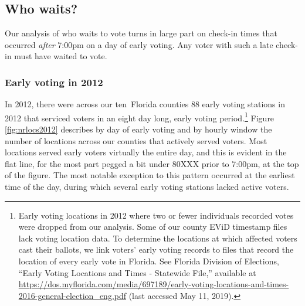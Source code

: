 \documentclass[12pt,titlepage]{article}
\newcommand{\numcounties}{ten}
\begin{document}

\subsection*{Who waits?}

Our analysis of who waits to vote turns in large part on check-in
times that occurred \emph{after} 7:00pm on a day of early voting.  Any
voter with such a late check-in must have waited to vote.

\subsubsection*{Early voting in 2012}




In 2012, there were across our \numcounties\ Florida counties 88 early
voting stations in 2012 that serviced voters in an eight day long,
early voting period.\footnote{Early voting locations in 2012 where two
  or fewer individuals recorded votes were dropped from our analysis.
  Some of our county EViD timestamp files lack voting location data.
  To determine the locations at which affected voters cast their
  ballots, we link voters' early voting records to files that record
  the location of every early vote in Florida. See Florida Division of
  Elections, ``Early Voting Locations and Times - Statewide File,''
  available at
  \url{https://dos.myflorida.com/media/697189/early-voting-locations-and-times-2016-general-election_eng.pdf}
  (last accessed May 11, 2019).}  Figure \ref{fig:nrlocs2012}
describes by day of early voting and by hourly window the number of
locations across our counties that actively served voters. Most
locations served early voters virtually the entire day, and this is
evident in the flat line, for the most part pegged a bit under 80XXX
prior to 7:00pm, at the top of the figure.  The most notable exception
to this pattern occurred at the earliest time of the day, during which
several early voting stations lacked active voters.
\end{document}
